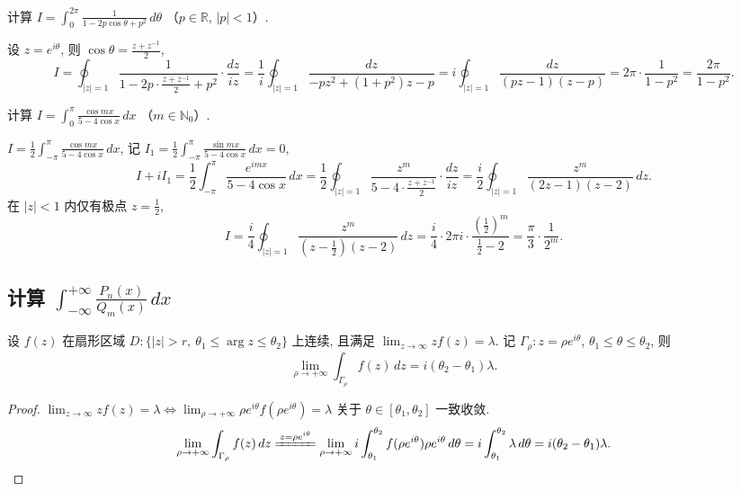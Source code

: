 \documentclass[theorem=false,mathfont=none,openany,sub3section]{easybook}
\begin{document}
\begin{example}
  计算 $I=\int_{0}^{2\pi}\frac{1}{1-2p\cos\theta+p^{2}}\,d\theta$
  （$p\in\mathbb R$, $|p|<1$）.

  设 $z=e^{i\theta}$, 则 $\cos\theta=\frac{z+z^{-1}}{2}$,
  \[
  I=\oint_{|z|=1}\frac{1}{1-2p\cdot\frac{z+z^{-1}}{2}+p^{2}}\cdot\frac{dz}{iz}
  =\frac{1}{i}\oint_{|z|=1}\frac{dz}{-pz^{2}+(1+p^{2})z-p}
  =i\oint_{|z|=1}\frac{dz}{(pz-1)(z-p)}
  =2\pi\cdot\frac{1}{1-p^{2}}=\frac{2\pi}{1-p^{2}}.
  \]
\end{example}

\begin{example}
  计算 $I=\int_{0}^{\pi}\frac{\cos mx}{5-4\cos x}\,dx$
  （$m\in\mathbb N_{0}$）.

  $I=\frac{1}{2}\int_{-\pi}^{\pi}\frac{\cos mx}{5-4\cos x}\,dx$, 记 $I_{1}=\frac{1}{2}\int_{-\pi}^{\pi}\frac{\sin mx}{5-4\cos x}\,dx=0$,
  \[
  I+iI_{1}=\frac{1}{2}\int_{-\pi}^{\pi}\frac{e^{imx}}{5-4\cos x}\,dx
  =\frac{1}{2}\oint_{|z|=1}\frac{z^{m}}{5-4\cdot\frac{z+z^{-1}}{2}}\cdot\frac{dz}{iz}
  =\frac{i}{2}\oint_{|z|=1}\frac{z^{m}}{(2z-1)(z-2)}\,dz.
  \]
  在 $|z|<1$ 内仅有极点 $z=\frac{1}{2}$,
  \[
  I=\frac{i}{4}\oint_{|z|=1}\frac{z^{m}}{(z-\frac{1}{2})(z-2)}\,dz
  =\frac{i}{4}\cdot2\pi i\cdot\frac{(\frac{1}{2})^{m}}{\frac{1}{2}-2}
  =\frac{\pi}{3}\cdot\frac{1}{2^{m}}.
  \]
\end{example}

\subsection{\texorpdfstring{计算 $\int_{-\infty}^{+\infty}\frac{P_{n}(x)}{Q_{m}(x)}\,dx$}{计算有理函数的广义积分}}

\begin{lemma}
  设 $f(z)$ 在扇形区域 $D:\{|z|>r,\ \theta_{1}\leq\arg z\leq\theta_{2}\}$ 上连续, 且满足 $\lim_{z\to\infty}zf(z)=\lambda$. 记 $\Gamma_{\rho}:z=\rho e^{i\theta}$, $\theta_{1}\leq\theta\leq\theta_{2}$, 则
  \[
  \lim_{\rho\to+\infty}\int_{\Gamma_{\rho}}f(z)\,dz=i(\theta_{2}-\theta_{1})\lambda.
  \]
\end{lemma}

\begin{proof}
  $\lim_{z\to\infty}zf(z)=\lambda\Leftrightarrow\lim_{\rho\to+\infty}\rho e^{i\theta}f(\rho e^{i\theta})=\lambda$ 关于 $\theta\in[\theta_{1},\theta_{2}]$ 一致收敛.
  \[
  \lim_{\rho\to+\infty}\int_{\Gamma_{\rho}}f(z)\,dz
  \xlongequal{z=\rho e^{i\theta}}\lim_{\rho\to+\infty}i\int_{\theta_{1}}^{\theta_{2}}f(\rho e^{i\theta})\rho e^{i\theta}\,d\theta
  =i\int_{\theta_{1}}^{\theta_{2}}\lambda\,d\theta
  =i(\theta_{2}-\theta_{1})\lambda.
  \]
\end{proof}
\end{document}
